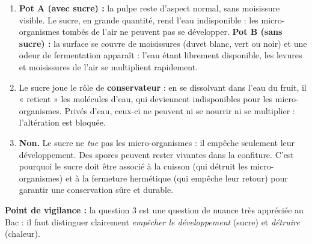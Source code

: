\documentclass[11pt]{article}
\begin{document}
\begin{corrige}
\begin{enumerate}
\item \textbf{Pot A (avec sucre) :} la pulpe reste d'aspect normal, sans moisissure visible. Le sucre, en grande quantité, rend l'eau indisponible : les micro-organismes tombés de l'air ne peuvent pas se développer. \textbf{Pot B (sans sucre) :} la surface se couvre de moisissures (duvet blanc, vert ou noir) et une odeur de fermentation apparaît : l'eau étant librement disponible, les levures et moisissures de l'air se multiplient rapidement.
\item Le sucre joue le rôle de \textbf{conservateur} : en se dissolvant dans l'eau du fruit, il « retient » les molécules d'eau, qui deviennent indisponibles pour les micro-organismes. Privés d'eau, ceux-ci ne peuvent ni se nourrir ni se multiplier : l'altération est bloquée.
\item \textbf{Non.} Le sucre ne \emph{tue} pas les micro-organismes : il empêche seulement leur développement. Des spores peuvent rester vivantes dans la confiture. C'est pourquoi le sucre doit être associé à la cuisson (qui détruit les micro-organismes) et à la fermeture hermétique (qui empêche leur retour) pour garantir une conservation sûre et durable.
\end{enumerate}
\textbf{Point de vigilance :} la question 3 est une question de nuance très appréciée au Bac : il faut distinguer clairement \emph{empêcher le développement} (sucre) et \emph{détruire} (chaleur).
\end{corrige}
\end{document}
